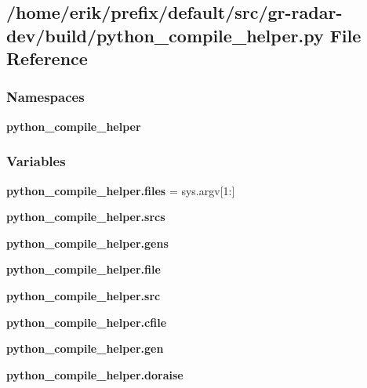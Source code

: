 \subsection{/home/erik/prefix/default/src/gr-\/radar-\/dev/build/python\+\_\+compile\+\_\+helper.py File Reference}
\label{python__compile__helper_8py}
\subsubsection*{Namespaces}
\begin{DoxyCompactItemize}
\item 
 {\bf python\+\_\+compile\+\_\+helper}
\end{DoxyCompactItemize}
\subsubsection*{Variables}
\begin{DoxyCompactItemize}
\item 
{\bf python\+\_\+compile\+\_\+helper.\+files} = sys.\+argv[1\+:]
\item 
{\bf python\+\_\+compile\+\_\+helper.\+srcs}
\item 
{\bf python\+\_\+compile\+\_\+helper.\+gens}
\item 
{\bf python\+\_\+compile\+\_\+helper.\+file}
\item 
{\bf python\+\_\+compile\+\_\+helper.\+src}
\item 
{\bf python\+\_\+compile\+\_\+helper.\+cfile}
\item 
{\bf python\+\_\+compile\+\_\+helper.\+gen}
\item 
{\bf python\+\_\+compile\+\_\+helper.\+doraise}
\end{DoxyCompactItemize}
